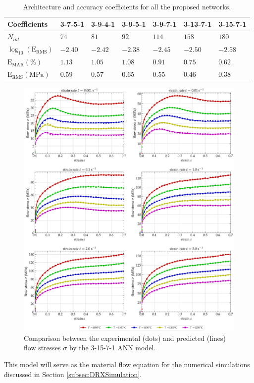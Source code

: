 \documentclass[metals,article,submit,pdftex,moreauthors]{Definitions/mdpi}
\DeclareRobustCommand{\RMSE}{\text{E}_\text{RMS}}
\DeclareRobustCommand{\MARE}{\text{E}_\text{MAR}}
\DeclareRobustCommand{\MPa}{\text{MPa}}
\begin{document}
\begin{table}[H]
\caption{Architecture and accuracy coefficients for all the proposed networks.}
\begin{tabularx}{\textwidth}{LCCCCCC}
\toprule
\textbf{Coefficients} & \textbf{3-7-5-1} & \textbf{3-9-4-1} & \textbf{3-9-5-1} & \textbf{3-9-7-1} & \textbf{3-13-7-1} & \textbf{3-15-7-1} \\
\toprule
$N_{int}$ & $74$ & $81$ & $92$ & $114$ & $158$ &$180$\\
\hline
$\log_{10}(\RMSE)$ & $-2.40$ & $-2.42$ & $-2.38$ & $-2.45$ & $-2.50$ & $-2.58$ \\
$\MARE(\%)$ & $1.13$ & $1.05$ & $1.08$ & $0.91$ & $0.75$ & $0.62$ \\
$\RMSE(\MPa)$ & $0.59$ & $0.57$ & $0.65$ & $0.55$ & $0.46$ & $0.38$ \\
\bottomrule
\end{tabularx}
\label{tab:Errors}
\end{table}

\begin{figure}[H]
\centering
\includegraphics[width=0.9\columnwidth]{Figures/CompExpANN-3-15-7-1}
\caption{Comparison between the experimental (dots) and predicted (lines) flow stresses $\sigma$ by the 3-15-7-1 ANN model.}
\label{fig:ANN-3-15-7-1}
\end{figure}
This model will serve as the material flow equation for the numerical simulations discussed in Section \ref{subsec:DRXSimulation}.
\end{document}
